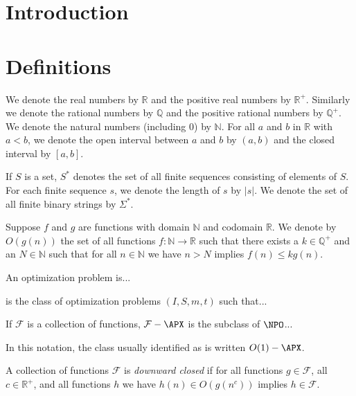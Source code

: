 \documentclass{article}
\begin{document}
\section{Introduction}

\section{Definitions}
We denote the real numbers by $\mathbb{R}$ and the positive real numbers by $\mathbb{R}^+$.
Similarly we denote the rational numbers by $\mathbb{Q}$ and the positive rational numbers by $\mathbb{Q}^+$.
We denote the natural numbers (including 0) by $\mathbb{N}$.
For all $a$ and $b$ in $\mathbb{R}$ with $a < b$, we denote the open interval between $a$ and $b$ by $(a, b)$ and the closed interval by $[a, b]$.

If $S$ is a set, $S^*$ denotes the set of all finite sequences consisting of elements of $S$.
For each finite sequence $s$, we denote the length of $s$ by $|s|$.
We denote the set of all finite binary strings by $\Sigma^*$.

\begin{definition}\label{def:bigo}
  Suppose $f$ and $g$ are functions with domain $\mathbb{N}$ and codomain $\mathbb{R}$.
  We denote by $O(g(n))$ the set of all functions $f \colon \mathbb{N} \to \mathbb{R}$ such that there exists a $k \in \mathbb{Q}^+$ and an $N \in \mathbb{N}$ such that for all $n \in \mathbb{N}$ we have $n > N$ implies $f(n) \leq k g(n)$.
\end{definition}

\begin{definition}
  An optimization problem is...
\end{definition}

\begin{definition}
  \NPO is the class of optimization problems $(I, S, m, t)$ such that...
\end{definition}

\begin{definition}
  If $\mathcal{F}$ is a collection of functions, $\mathcal{F}-\APX$ is the subclass of $\NPO$...

\end{definition}

In this notation, the class usually identified as \APX{} is written $O(1)-\APX$.

\begin{definition}\label{def:downwardclosed}
  A collection of functions $\mathcal{F}$ is \emph{downward closed} if for all functions $g \in \mathcal{F}$, all $c \in \mathbb{R}^+$, and all functions $h$ we have $h(n) \in O(g(n^c))$ implies $h \in \mathcal{F}$.
\end{definition}
\end{document}
